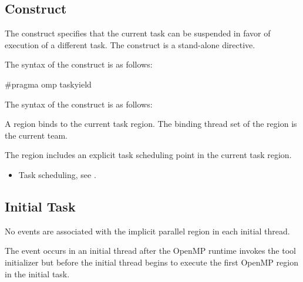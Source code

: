 \subsection{ Construct}
\label{subsec:taskyield Construct}
\summary
The  construct specifies that the current task can be 
suspended in favor of execution of a different task. The  
construct is a stand-alone directive.

\syntax
\begin{ccppspecific}
The syntax of the  construct is as follows:

\begin{ompcPragma}
#pragma omp taskyield 
\end{ompcPragma}
\end{ccppspecific}

\begin{fortranspecific}
The syntax of the  construct is as follows:

\end{fortranspecific}

\binding
A  region binds to the current task region. The binding thread 
set of the  region is the current team.

\descr
The  region includes an explicit task scheduling point in the 
current task region.

\crossreferences
\begin{itemize}
\item Task scheduling, see
.
\end{itemize}

\subsection{Initial Task}
\label{subsec:Initial Task}

\events
No events are associated with the implicit parallel region in each initial thread.

The  event occurs in an initial thread after the OpenMP 
runtime invokes the tool initializer but before the initial thread begins to execute 
the first OpenMP region in the initial task.

